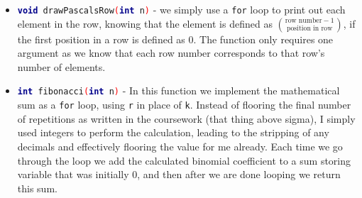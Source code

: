 \documentclass[11pt]{article} %
\begin{document}
\begin{enumerate}[(a)]
\begin{itemize}
		\item \texttt{\footnotesize \textbf{\textcolor{darkBlue}{void}}~drawPascalsRow\textcolor{red}{(}\textbf{\textcolor{darkBlue}{int}}~n\textcolor{red}{)}} - we simply use a \texttt{\footnotesize for} loop to print out each element in the row, knowing that the element is defined as $\text{row number}-1 \choose \text{position in row}$, if the first position in a row is defined as 0. The function only requires one argument as we know that each row number corresponds to that row's number of elements.
		\item \texttt{\footnotesize \textbf{\textcolor{darkBlue}{int}}~fibonacci\textcolor{red}{(}\textbf{\textcolor{darkBlue}{int}}~n\textcolor{red}{)}} - In this function we implement the mathematical sum as a \texttt{\footnotesize for} loop, using \texttt{\footnotesize r} in place of \texttt{\footnotesize k}. Instead of flooring the final number of repetitions as written in the coursework (that thing above sigma), I simply used integers to perform the calculation, leading to the stripping of any decimals and effectively flooring the value for me already. Each time we go through the loop we add the calculated binomial coefficient to a sum storing variable that was initially 0, and then after we are done looping we return this sum.
	\end{itemize}
\end{enumerate}
\newpage
\end{document}
